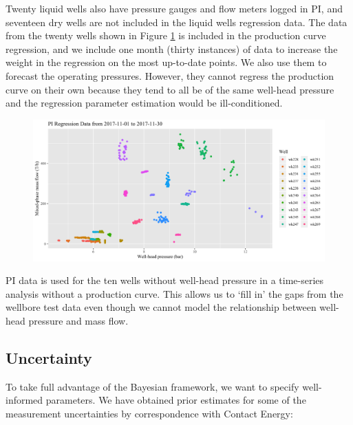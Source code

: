 \documentclass[a4paper, 12pt]{article}
\begin{document}

Twenty liquid wells also have pressure gauges and flow meters logged in PI, and seventeen dry wells are not included in the liquid wells regression data. The data from the twenty wells shown in Figure \ref{fig:pi_data} is included in the production curve regression, and we include one month (thirty instances) of data to increase the weight in the regression on the most up-to-date points. We also use them to forecast the operating pressures. However, they cannot regress the production curve on their own because they tend to all be of the same well-head pressure and the regression parameter estimation would be ill-conditioned.

\begin{figure}
  \centering
  \includegraphics[width=\linewidth]{media/pi_data}
  \label{fig:pi_data}
\end{figure}

PI data is used for the ten wells without well-head pressure in a time-series analysis without a production curve. This allows us to `fill in' the gaps from the wellbore test data even though we cannot model the relationship between well-head pressure and mass flow.

\subsection{Uncertainty}
To take full advantage of the Bayesian framework, we want to specify well-informed parameters. We have obtained prior estimates for some of the measurement uncertainties by correspondence with Contact Energy:
\end{document}

